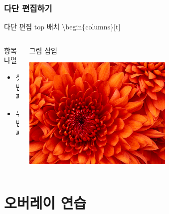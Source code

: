 \documentclass[9pt,blue,xcolor=pdftex,dvipsnames,table,handout,notes]{beamer}
\begin{document}
		\begin{frame}[t]
		\frametitle{다단 편집하기}


			\begin{example} {다단 편집 top 배치}
			\textbackslash begin\{columns\}[t]
			\end{example}


		\begin{columns}[t,onlytextwidth]
		\begin{column}{.46\textwidth}
			\begin{block} {항목 나열}
			\begin{itemize}
			\item 첫 번째
			\item 두 번째
			\end{itemize}
			\end{block}
		\end{column}

		\begin{column}{.50\textwidth}
			\begin{block} {그림 삽입}
			\centerline{\includegraphics[scale=1.0,width=0.6\textwidth]{./fig/Chrysanthemum.jpg}}
			\end{block}
		\end{column}

		\end{columns}
		\end{frame}



		\section{오버레이 연습} 

		\begin{frame}[plain]
		\centering

		\end{frame}
\end{document}
